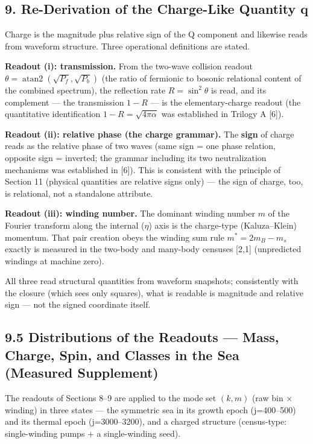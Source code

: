 \documentclass[
  a4paper,
]{article}
\begin{document}
\subsection{9. Re-Derivation of the Charge-Like Quantity
q}\label{re-derivation-of-the-charge-like-quantity-q}

Charge is the magnitude plus relative sign of the Q component and
likewise reads from waveform structure. Three operational definitions
are stated.

\textbf{Readout (i): transmission.} From the two-wave collision readout
\(\theta = \operatorname{atan2}(\sqrt{P_f}, \sqrt{P_b})\) (the ratio of
fermionic to bosonic relational content of the combined spectrum), the
reflection rate \(R=\sin^2\theta\) is read, and its complement --- the
transmission \(1-R\) --- is the elementary-charge readout (the
quantitative identification \(1-R=\sqrt{4\pi\alpha}\) was established in
Trilogy A {[}6{]}).

\textbf{Readout (ii): relative phase (the charge grammar).} The
\textbf{sign} of charge reads as the relative phase of two waves (same
sign = one phase relation, opposite sign = inverted; the grammar
including its two neutralization mechanisms was established in {[}6{]}).
This is consistent with the principle of Section 11 (physical quantities
are relative signs only) --- the sign of charge, too, is relational, not
a standalone attribute.

\textbf{Readout (iii): winding number.} The dominant winding number
\(m\) of the Fourier transform along the internal (\(\eta\)) axis is the
charge-type (Kaluza--Klein) momentum. That pair creation obeys the
winding sum rule \(m^* = 2m_B - m_s\) exactly is measured in the
two-body and many-body censuses {[}2,1{]} (unpredicted windings at
machine zero).

All three read structural quantities from waveform snapshots;
consistently with the closure (which sees only squares), what is
readable is magnitude and relative sign --- not the signed coordinate
itself.

\subsection{9.5 Distributions of the Readouts --- Mass, Charge, Spin,
and Classes in the Sea (Measured
Supplement)}\label{distributions-of-the-readouts-mass-charge-spin-and-classes-in-the-sea-measured-supplement}

The readouts of Sections 8--9 are applied to the mode set \((k, m)\)
(raw bin \(\times\) winding) in three states --- the symmetric sea in
its growth epoch (j=400--500) and its thermal epoch (j=3000--3200), and
a charged structure (census-type: single-winding pumps + a
single-winding seed).
\end{document}

